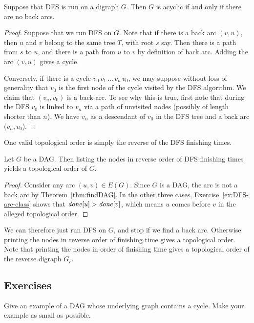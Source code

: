 \begin{Theorem}
\label{thm:findDAG}
Suppose that DFS is run on a digraph $G$. Then $G$ is acyclic if and
only if there are no back arcs.
\end{Theorem}

\begin{proof}
Suppose that we run DFS on $G$. Note that if there is a
back arc $(v, u)$, then $u$ and $v$ belong to the same tree $T$, with
root $s$ say. Then there is a path from $s$ to $u$, and there is a path
from $u$ to $v$ by definition of back arc. Adding the arc $(v, u)$ gives
a cycle. 

Conversely, if there is a cycle $v_0\, v_1\, \dots \, v_n\, v_0$, we may
suppose without loss of generality that $v_0$ is the first node of the
cycle  visited by the DFS algorithm. We claim that $(v_n, v_0)$ is a
back arc. To see why this is true, first note that during the DFS $v_0$ is 
linked to $v_n$ via a path of unvisited nodes (possibly of length shorter 
than $n$).  We have $v_n$ as a descendant of $v_0$ in the DFS tree and
a back arc ($v_n, v_0$).
\end{proof}

One valid topological order is simply the reverse of the DFS finishing times.

\begin{Theorem}
Let $G$ be a DAG. Then listing the nodes in reverse order of DFS
finishing times yields a topological order of $G$.
\end{Theorem}

\begin{proof} 
Consider any arc $(u,v)\in E(G)$. Since $G$ is a DAG,
the arc is not a back arc by Theorem~\ref{thm:findDAG}. In the other three
cases, Exercise~\ref{ex:DFS-arc-class} shows that $\operatorname{\text{\textit{done}}}[u] > \operatorname{\text{\textit{done}}}[v]$,
which means $u$ comes before $v$ in the alleged topological order.
\end{proof}

We can therefore just run DFS on $G$, and stop if we find a back
arc. Otherwise printing the nodes in reverse order of finishing time
gives a topological order. Note that printing the nodes in order of
finishing time gives a topological order of the reverse digraph $G_r$.

\subsection*{Exercises}

\begin{Exercise}
\label{ex:DAG-vs-tree}
Give an example of a DAG whose underlying graph contains a cycle. Make
your example as small as possible.
\end{Exercise}

